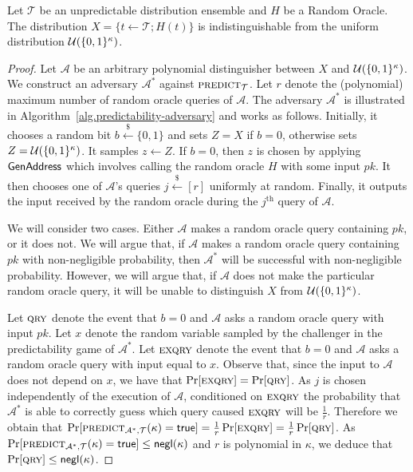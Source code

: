 \begin{lemma}\label{lem:ro-unpredictability}
  Let $\mathcal{T}$ be an unpredictable distribution ensemble and $H$ be a
  Random Oracle.
  The distribution $X = \{t \gets \mathcal{T}; H(t)\}$ is indistinguishable from
  the uniform distribution $\mathcal{U}(\{0,1\}^\kappa)$.
\end{lemma}
\begin{proof}
  Let $\mathcal{A}$ be an arbitrary polynomial distinguisher between
  $X$ and $\mathcal{U}(\{0, 1\}^\kappa)$.
  We construct an adversary $\mathcal{A}^*$
  against $\textsc{predict}_{\mathcal{T}}$.
  Let $r$ denote the (polynomial)
  maximum number of random oracle queries of $\mathcal{A}$.
  The adversary $\mathcal{A}^*$ is illustrated in
  Algorithm~\ref{alg.predictability-adversary} and works as follows.
  Initially, it chooses a random bit $b \stackrel{\$}{\gets} \{0, 1\}$ and
  sets $Z = X$ if $b = 0$, otherwise
  sets $Z = \mathcal{U}(\{0,1\}^\kappa)$.
  It samples $z \gets Z$.
  If $b = 0$, then $z$ is chosen by applying $\mathsf{GenAddress}$ which involves
  calling the random oracle $H$ with some input $pk$.
  It then chooses one of $\mathcal{A}$'s queries $j \stackrel{\$}{\gets} [r]$
  uniformly at random. Finally, it outputs the input received by the random
  oracle during the $j^\text{th}$ query of $\mathcal{A}$.

  We will consider two cases. Either $\mathcal{A}$ makes a random oracle query
  containing $pk$, or it does not. We will argue that, if $\mathcal{A}$ makes
  a random oracle query containing $pk$ with non-negligible probability, then
  $\mathcal{A}^*$ will be successful with non-negligible probability. However,
  we will argue that, if $\mathcal{A}$ does not make the particular random
  oracle query, it will be unable to distinguish $X$ from $\mathcal{U}(\{0,1\}^\kappa)$.

  Let $\textsc{qry}$ denote the event that $b = 0$ and $\mathcal{A}$ asks a random
  oracle query with input $pk$.
  Let $x$ denote the random variable sampled by the challenger in the
  predictability game of $\mathcal{A}^*$.
  Let $\textsc{exqry}$ denote the event that $b = 0$ and $\mathcal{A}$ asks a
  random oracle query with input equal to $x$. Observe that, since the input to
  $\mathcal{A}$ does not depend on $x$, we have that
  $\Pr[\textsc{exqry}] = \Pr[\textsc{qry}]$. As $j$ is chosen independently of the execution
  of $\mathcal{A}$, conditioned on $\textsc{exqry}$ the probability that
  $\mathcal{A}^*$ is able to correctly guess which query caused $\textsc{exqry}$ will
  be $\frac{1}{r}$. Therefore we obtain that
  $\Pr[\textsc{predict}_{\mathcal{A}^*,\mathcal{T}}(\kappa) = \mathsf{true}]
   = \frac{1}{r}\Pr[\textsc{exqry}]
   = \frac{1}{r}\Pr[\textsc{qry}]$.
  As
  $\Pr[\textsc{predict}_{\mathcal{A}^*,\mathcal{T}}(\kappa) = \mathsf{true}] \leq \textsf{negl}(\kappa)$
  and $r$
  is polynomial in $\kappa$, we deduce that $\Pr[\textsc{qry}] \leq \textsf{negl}(\kappa)$.


\end{proof}
